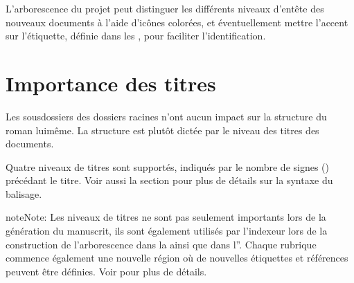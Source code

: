 \documentclass[a4paper,11pt,french]{sphinxmanual}
\begin{document}
\sphinxAtStartPar
L’arborescence du projet peut distinguer les différents niveaux d’en\sphinxhyphen{}tête des nouveaux documents à l’aide d’icônes colorées, et éventuellement mettre l’accent sur l’étiquette, définie dans les , pour faciliter l’identification.


\section{Importance des titres}
\label{\detokenize{project_structure:importance-of-headings}}\label{\detokenize{project_structure:a-struct-heads}}
\sphinxAtStartPar
Les sous\sphinxhyphen{}dossiers des dossiers racines n’ont aucun impact sur la structure du roman lui\sphinxhyphen{}même. La structure est plutôt dictée par le niveau des titres des documents.

\sphinxAtStartPar
Quatre niveaux de titres sont supportés, indiqués par le nombre de signes (\sphinxcode{\sphinxupquote{\#}}) précédant le titre. Voir aussi la section {\hyperref[\detokenize{usage_format:a-fmt}]{}} pour plus de détails sur la syntaxe du balisage.

\begin{sphinxadmonition}{note}{Note:}
\sphinxAtStartPar
Les niveaux de titres ne sont pas seulement importants lors de la génération du manuscrit, ils sont également utilisés par l’indexeur lors de la construction de l’arborescence dans la  ainsi que dans l”. Chaque rubrique commence également une nouvelle région où de nouvelles étiquettes et références peuvent être définies. Voir {\hyperref[\detokenize{project_references:a-references}]{}} pour plus de détails.
\end{sphinxadmonition}
\end{document}
